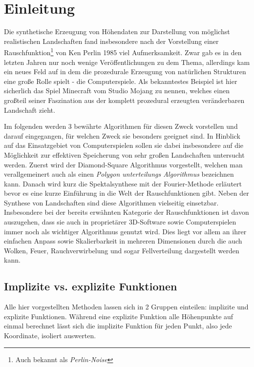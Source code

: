 \chapter{Einleitung}

Die synthetische Erzeugung von Höhendaten zur Darstellung von möglichst realistischen Landschaften fand insbesondere nach der Vorstellung einer Rauschfunktion\footnote{Auch bekannt als \emph{Perlin-Noise}} von Ken Perlin 1985\cite{PERLIN1985} viel Aufmerksamkeit. Zwar gab es in den letzten Jahren nur noch wenige Veröffentlichungen zu dem Thema, allerdings kam ein neues Feld auf in dem die prozedurale Erzeugung von natürlichen Strukturen eine große Rolle spielt - die Computerspiele.
Als bekanntestes Beispiel ist hier sicherlich das Spiel Minecraft vom Studio Mojang zu nennen, welches einen großteil seiner Faszination aus der komplett prozedural erzeugten veränderbaren Landschaft zieht.

Im folgenden werden 3 bewährte Algorithmen für diesen Zweck vorstellen und darauf eingegangen, für welchen Zweck sie besonders geeignet sind.
In Hinblick auf das Einsatzgebiet von Computerspielen sollen sie dabei insbesondere auf die Möglichkeit zur effektiven Speicherung von sehr großen Landschaften untersucht werden.
Zuerst wird der Diamond-Square Algorithmus\cite{DiamondSquare} vorgestellt, welchen man verallgemeinert auch als einen \emph{Polygon unterteilungs Algorithmus} bezeichnen kann. Danach wird kurz die Spektalsynthese mit der Fourier-Methode erläutert bevor es eine kurze Einführung in die Welt der Rauschfunktionen gibt.
Neben der Synthese von Landschaften sind diese Algorithmen vielseitig einsetzbar. Insbesondere bei der bereits erwähnten Kategorie der Rauschfunktionen ist davon auszugehen, dass sie auch in proprietärer 3D-Software sowie Computerspielen immer noch als wichtiger Algorithmus genutzt wird. Dies liegt vor allem an ihrer einfachen Anpass sowie Skalierbarkeit in mehreren Dimensionen durch die auch Wolken, Feuer, Rauchverwirbelung und sogar Fellverteilung dargestellt werden kann\cite{texturingAndModeling}.

\section{Implizite vs. explizite Funktionen}
Alle hier vorgestellten Methoden lassen sich in 2 Gruppen einteilen: implizite und explizite Funktionen.
Während eine explizite Funktion alle Höhenpunkte auf einmal berechnet lässt sich die implizite Funktion für jeden Punkt, also jede Koordinate, isoliert auswerten. 

